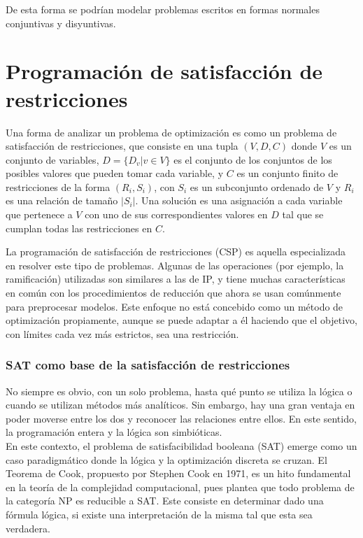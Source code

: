 \documentclass[runningheads]{llncs}
\begin{document}
De esta forma se podrían modelar problemas escritos en formas normales conjuntivas y disyuntivas.

\section{Programación de satisfacción de restricciones}

Una forma de analizar un problema de optimización es como un problema de satisfacción de restricciones, que consiste en una tupla $(V,D,C)$ donde $V$ es un conjunto de variables, $D=\{D_v|v\in V\}$ es el conjunto de los conjuntos de los posibles valores que pueden tomar cada variable, y $C$ es un conjunto finito de restricciones de la forma $(R_i,S_i)$, con $S_i$ es un subconjunto ordenado de $V$ y $R_i$ es una relación de tamaño $|S_i|$. Una solución es una asignación a cada variable que pertenece a $V$ con uno de sus correspondientes valores en $D$ tal que se cumplan todas las restricciones en $C$.

La programación de satisfacción de restricciones (CSP) es aquella especializada en resolver este tipo de problemas. Algunas de las operaciones (por ejemplo, la ramificación) utilizadas son similares a las de IP, y tiene muchas características en común con los procedimientos de reducción que ahora se usan comúnmente para preprocesar modelos. Este enfoque no está concebido como un método de optimización propiamente, aunque se puede adaptar a él haciendo que el objetivo, con límites cada vez más estrictos, sea una restricción.

\subsubsection{SAT como base de la satisfacción de restricciones\\}

No siempre es obvio, con un solo problema, hasta qué punto se utiliza la lógica o cuando se utilizan métodos más analíticos. Sin embargo, hay una gran ventaja en poder moverse entre los dos y reconocer las relaciones entre ellos. En este sentido, la programación entera y la lógica son simbióticas.\\

En este contexto, el problema de satisfacibilidad booleana (SAT) emerge como un caso paradigmático donde la lógica y la optimización discreta se cruzan. El Teorema de Cook, propuesto por Stephen Cook en 1971, es un hito fundamental en la teoría de la complejidad computacional, pues plantea que todo problema de la categoría NP es reducible a SAT. Este consiste en determinar dado una fórmula lógica, si existe una interpretación de la misma tal que esta sea verdadera.\\ 
\end{document}
